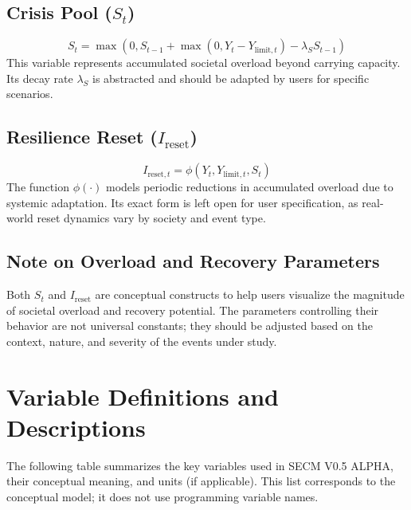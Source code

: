 \documentclass[12pt,a4paper]{article}
\begin{document}
\subsection{Crisis Pool ($S_t$)}
\begin{equation}
S_t = \max(0, S_{t-1} + \max(0, Y_t - Y_{\mathrm{limit},t}) - \lambda_S S_{t-1})
\end{equation}
This variable represents accumulated societal overload beyond carrying capacity. Its decay rate $\lambda_S$ is abstracted and should be adapted by users for specific scenarios.

\subsection{Resilience Reset ($I_{\mathrm{reset}}$)}
\begin{equation}
I_{\mathrm{reset},t} = \phi(Y_t, Y_{\mathrm{limit},t}, S_t)
\end{equation}
The function $\phi(\cdot)$ models periodic reductions in accumulated overload due to systemic adaptation. Its exact form is left open for user specification, as real-world reset dynamics vary by society and event type.

\subsection{Note on Overload and Recovery Parameters}
Both $S_t$ and $I_{\mathrm{reset}}$ are conceptual constructs to help users visualize the magnitude of societal overload and recovery potential. The parameters controlling their behavior are not universal constants; they should be adjusted based on the context, nature, and severity of the events under study.
\section{Variable Definitions and Descriptions}

The following table summarizes the key variables used in SECM V0.5 ALPHA, their conceptual meaning, and units (if applicable). This list corresponds to the conceptual model; it does not use programming variable names.
\end{document}
